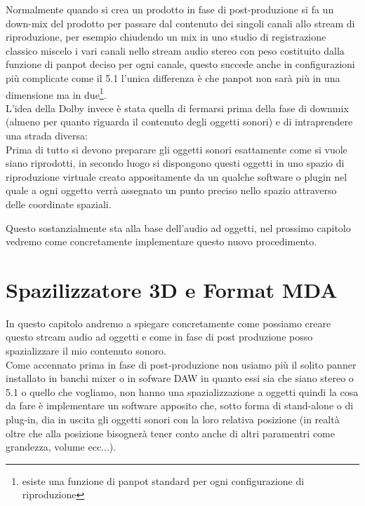 \documentclass[12pt,a4paper]{report}
\begin{document}
Normalmente quando si crea un prodotto in fase di post-produzione si fa un down-mix del prodotto per passare dal contenuto dei singoli canali allo stream di riproduzione, per esempio chiudendo un mix in uno studio di registrazione classico miscelo i vari canali nello stream audio stereo con peso costituito dalla funzione di panpot deciso per ogni canale, questo succede anche in configurazioni più complicate come il 5.1 l'unica differenza è che panpot non sarà più in una dimensione ma in due\footnote{esiste una funzione di panpot standard per ogni configurazione di riproduzione}.\\

L'idea della Dolby invece è stata quella di fermarsi prima della fase di downmix (almeno per quanto riguarda il contenuto degli oggetti sonori) e di intraprendere una strada diversa:\\

Prima di tutto si devono preparare gli oggetti sonori esattamente come si vuole siano riprodotti, in secondo luogo si dispongono questi oggetti in uno spazio di riproduzione virtuale creato appositamente da un qualche software o plugin nel quale a ogni oggetto verrà assegnato un punto preciso nello spazio attraverso delle coordinate spaziali.

Questo sostanzialmente sta alla base dell'audio ad oggetti, nel prossimo capitolo vedremo come concretamente implementare questo nuovo procedimento.



\chapter{Spazilizzatore 3D e Format MDA}

In questo capitolo andremo a spiegare concretamente come possiamo creare questo stream audio ad oggetti e come in fase di post produzione posso spazializzare il mio contenuto sonoro.\\

Come accennato prima in fase di post-produzione non usiamo più il solito panner installato in banchi mixer o in sofware DAW in quanto essi sia che siano stereo o 5.1 o quello che vogliamo, non hanno una spazializzazione a oggetti quindi la cosa da fare è implementare un software apposito che, sotto forma di stand-alone o di plug-in, dia in uscita gli oggetti sonori con la loro relativa posizione (in realtà oltre che alla posizione bisognerà tener conto anche di altri paramentri come grandezza, volume ecc...).\\
\end{document}
